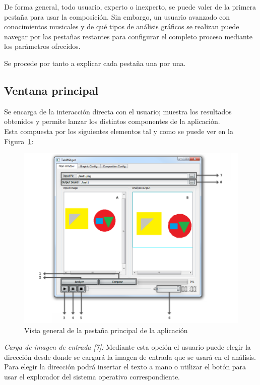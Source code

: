 		De forma general, todo usuario, experto o inexperto, se puede valer de la primera pestaña para usar la composición. Sin embargo, un usuario avanzado con conocimientos musicales y de qué tipos de análisis gráficos se realizan puede navegar por las pestañas restantes para configurar el completo proceso mediante los parámetros ofrecidos.
		
		Se procede por tanto a explicar cada pestaña una por una.

	\subsection{Ventana principal}
		
		Se encarga de la interacción directa con el usuario; muestra los resultados obtenidos y permite lanzar los distintos componentes de la aplicación. 
		\\Esta compuesta por los siguientes elementos tal y como se puede ver en la Figura~\ref{fig:interfaz}:\\
		
		
		\begin{figure}[htbp]
		\centering
		\hspace*{-0.9in}
		\includegraphics[scale=0.57]{graphics/interfaz.png}
		\caption{Vista general de la pestaña principal de la aplicación}
		\label{fig:interfaz}
		\end{figure}
		
		\noindent\textit{Carga de imagen de entrada [7]:}  Mediante esta opción el usuario puede elegir la dirección desde donde se cargará la imagen de entrada que se usará en el análisis. Para elegir la dirección podrá insertar el texto a mano o utilizar el botón para usar el explorador del sistema operativo correspondiente.\\
		
